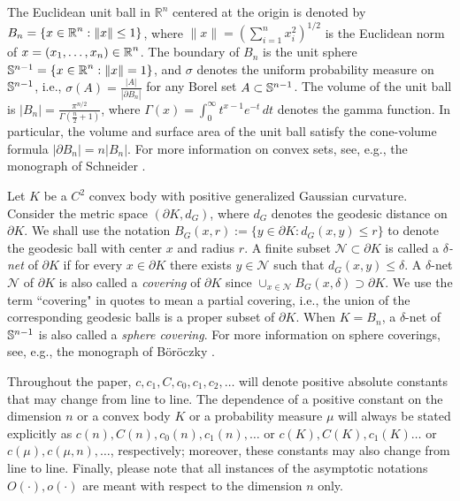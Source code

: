 The Euclidean unit ball in $\mathbb R^n$ centered at the origin is denoted by $B_n=\{x\in\operatorname{\mathbb{R}}^n: \|x\|\leq 1\}$, where $\|x\|= (\sum_{i=1}^n x_i^2)^{1/2}$ is the Euclidean norm of $x=(x_1,\ldots,x_n)\in\operatorname{\mathbb{R}}^n$. The boundary of $B_n$ is the unit sphere $\mathbb{S}^{n-1}=\{x\in\operatorname{\mathbb{R}}^n: \|x\|=1\}$, and $\sigma$ denotes the uniform probability measure on $\mathbb{S}^{n-1} $, i.e., $\sigma(A) = \frac{|A|}{|\partial B_n|}$ for any Borel set $A\subset\mathbb{S}^{n-1}$. The volume of the unit ball is $|B_n| = \frac{\pi^{n/2}}{\Gamma(\frac{n}{2}+1)}$, where $\Gamma(x)=\int_0^\infty t^{x-1}e^{-t}\,dt$ denotes the gamma function. In particular, the volume and surface area of the unit ball satisfy the cone-volume formula $|\partial B_n|=n|B_n|$. For more information on convex sets, see, e.g., the monograph of Schneider \cite{SchneiderBook}.

\vspace{2mm}

Let $ K$ be a $ C^2 $ convex body with  positive generalized Gaussian curvature. Consider the metric space $(\partial K, d_G)$, where $d_G$ denotes the geodesic distance on $\partial K$. We shall use the notation $B_G(x,r):=\{y\in\partial K: d_G(x,y)\leq r\}$ to denote the geodesic ball with center $x$ and radius $r$. A finite subset $\mathcal N\subset \partial K$ is called a {\it $\delta$-net} of $\partial K$ if for every $x\in \partial K$ there exists $y\in \mathcal N$ such that $d_G(x,y) \leq \delta$. A $\delta$-net $\mathcal N$ of $\partial K$ is also called a {\it covering} of $\partial K$  since $\cup_{x\in\mathcal N}B_G(x,\delta)\supset \partial K$. We use the term ``covering" in quotes to mean a partial covering, i.e.,  the union of the corresponding geodesic balls is a proper subset of $\partial K$. When $ K = B_n $, a $\delta$-net of $\mathbb{S}^{n-1}$ is also called a {\it sphere covering}. %
For more information on sphere coverings, see, e.g., the monograph of B\"or\"oczky \cite{boroczky2004finite}. 

\vspace{2mm}

Throughout the paper, $c,c_1,C,c_0,c_1,c_2,\ldots$ will denote positive absolute constants that may change from line to line. The dependence of a positive constant on  the dimension $n$ or a convex body $K$ or a probability measure $\mu$ will always be stated explicitly as  $ c(n),C(n),c_0(n),c_1(n),\ldots$ or $ c(K), C(K), c_1(K)\ldots $ or $c(\mu), c(\mu,n),\ldots$, respectively; moreover, these constants  may also change from line to line. Finally, please note that all instances of the asymptotic notations $O(\cdot),o(\cdot)$ are meant with respect to the dimension $n$ only.

